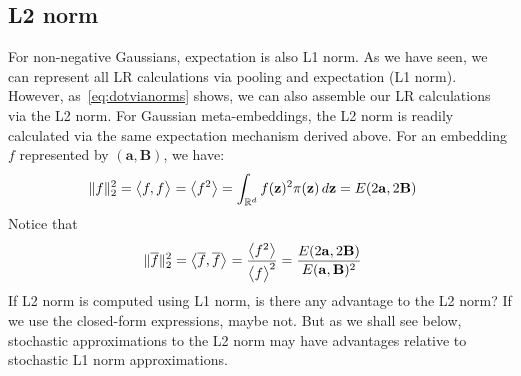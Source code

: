 \documentclass[a4paper,oneside,12pt,english]{report}
\def\zvec{\mathbf{z}}
\def\expv#1#2{\bigl\langle#1\bigr\rangle_{#2}}
\def\expp#1{\bigl\langle#1\bigr\rangle}
\def\R{\mathbb{R}}
\def\Bmat{\mathbf{B}}
\def\Imat{\mathbf{I}}
\def\avec{\mathbf{a}}
\def\dot#1#2{\expv{#1,#2}{}}
\def\normal#1{\overline{#1}}
\def\dotn#1#2{\dot{\normal{#1}}{\normal{#2}}}
\begin{document}
\subsection{L2 norm}
For non-negative Gaussians, expectation is also L1 norm. As we have seen, we can represent all LR calculations via pooling and expectation (L1 norm). However, as~\eqref{eq:dotvianorms} shows, we can also assemble our LR calculations via the L2 norm. For Gaussian meta-embeddings, the L2 norm is readily calculated via the same expectation mechanism derived above. For an embedding $f$ represented by $(\avec,\Bmat)$, we have:
\begin{align}
\norm{f}^2 &= \dot{f}{f} = \expp{f^2} = \int_{\R^d}f(\zvec)^2\pi(\zvec)\,d\zvec = E(2\avec,2\Bmat)
\end{align}  
Notice that 
\begin{align}
\norm{\normal{f}}^2 &= \dotn{f}{f} = \frac{\expp{f^2}}{\expp{f}^2} = \frac{E(2\avec,2\Bmat)}{E(\avec,\Bmat)^2}
\end{align}  
If L2 norm is computed using L1 norm, is there any advantage to the L2 norm? If we use the closed-form expressions, maybe not. But as we shall see below, stochastic approximations to the L2 norm may have advantages relative to stochastic L1 norm approximations.



\end{document}
